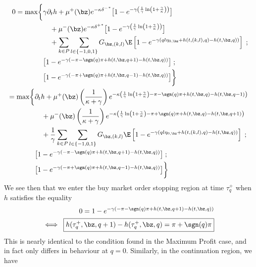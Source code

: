 \documentclass[12pt]{article}
\begin{document}
\begin{align}
\begin{split}
0 = \max \biggl\lbrace & \gamma \partial_t h + \mu^+(\bz) e^{ -\kappa{\delta^-}^*} \bigl[ 1 - e^{-\gamma\left(\frac{1}{\gamma} \ln \left( 1 + \frac{\gamma}{\kappa}\right)\right)} \bigr] \\
& \quad + \mu^-(\bz) e^{ -\kappa {\delta^+}^*} \bigl[ 1 - e^{-\gamma \left( \frac{1}{\gamma} \ln \left( 1 + \frac{\gamma}{\kappa}\right) \right)} \bigr] \\
& \quad + \sum_{k\in P} \sum_{l \in \{-1,0,1\}} G_{\bz,(k,l)} \E \left[ 1 - e^{-\gamma(ql\eta_{0,\bz} + h(t,(k,l),q) - h(t,\bz,q))} \right] \; ; \\
& \bigl[ 1- e^{-\gamma(-\pi - \sgn(q)\pi + h(t,\bz,q+1) - h(t,\bz,q)) } \bigr] \; ; \\
& \bigl[ 1- e^{-\gamma(-\pi + \sgn(q)\pi + h(t,\bz,q-1) - h(t,\bz,q)) } \bigr] \biggr\rbrace
\end{split}\\
\begin{split}
\label{eq:PDEcase2}
= \max \biggl\lbrace & \partial_t h + \mu^+(\bz) \left( \frac{1}{\kappa + \gamma} \right) e^{ -\kappa\left( \frac{1}{\gamma} \ln \left( 1 + \frac{\gamma}{\kappa}\right) - \pi - \sgn(q)\pi + h(t,\bz,q) - h(t,\bz,q-1) \right)}  \\
& \quad + \mu^-(\bz) \left( \frac{1}{\kappa + \gamma} \right) e^{ -\kappa \left( \frac{1}{\gamma} \ln \left( 1 + \frac{\gamma}{\kappa}\right) - \pi + \sgn(q)\pi + h(t,\bz,q) - h(t,\bz,q+1) \right)} \\
& \quad + \frac{1}{\gamma} \sum_{k\in P} \sum_{l \in \{-1,0,1\}} G_{\bz,(k,l)} \E \left[ 1 - e^{-\gamma(ql\eta_{0,\bz} + h(t,(k,l),q) - h(t,\bz,q))} \right] \; ; \\
& \bigl[ 1- e^{-\gamma(-\pi - \sgn(q)\pi + h(t,\bz,q+1) - h(t,\bz,q)) } \bigr] \; ; \\
& \bigl[ 1- e^{-\gamma(-\pi + \sgn(q)\pi + h(t,\bz,q-1) - h(t,\bz,q)) } \bigr] \biggr\rbrace
\end{split}
\end{align}
We see then that we enter the buy market order stopping region at time $\tau_q^+$ when $h$ satisfies the equality
\begin{align}
0 = 1- e^{-\gamma(-\pi - \sgn(q)\pi + h(t,\bz,q+1) - h(t,\bz,q)) } \\
\label{eq:buyMOfeedbackcase2}
\iff \; \boxed{ h(\tau^+_q, \bz, q+1) - h(\tau^+_q,\bz,q) = \pi + \sgn(q) \pi }
\end{align}
This is nearly identical to the condition found in the Maximum Profit case, and in fact only differs in behaviour at $q=0$. Similarly, in the continuation region, we have
\end{document}
